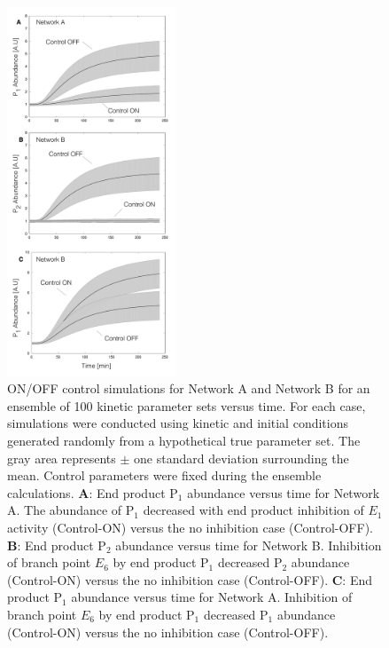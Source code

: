 \documentclass[processes,article,accept,moreauthors,pdftex,12pt,a4paper]{mdpi}
\begin{document}
\begin{figure}[H]
\centering
\includegraphics[width=0.450\textwidth]{./figs/Figure-4-OnOffSimulations.pdf}
\caption{ON/OFF control simulations for Network A and Network B for an ensemble of 100 kinetic parameter sets versus time. 
For each case, simulations were conducted using kinetic and initial conditions generated randomly from a hypothetical true parameter set. 
The gray area represents $\pm$ one standard deviation surrounding the mean. 
Control parameters were fixed during the ensemble calculations.
\textbf{A}: End product P$_{1}$ abundance versus time for Network A. 
The abundance of P$_{1}$ decreased with end product inhibition of $E_{1}$ activity (Control-ON) versus the no inhibition case (Control-OFF). 
\textbf{B}: End product P$_{2}$ abundance versus time for Network B. Inhibition of branch point $E_{6}$ by end product P$_{1}$ decreased P$_{2}$ abundance (Control-ON) versus the
no inhibition case (Control-OFF).
\textbf{C}: End product P$_{1}$ abundance versus time for Network A. 
Inhibition of branch point $E_{6}$ by end product P$_{1}$ decreased P$_{1}$ abundance (Control-ON) versus the no inhibition case (Control-OFF).}\label{fig-onoff-simulations}
\end{figure}
\end{document}
